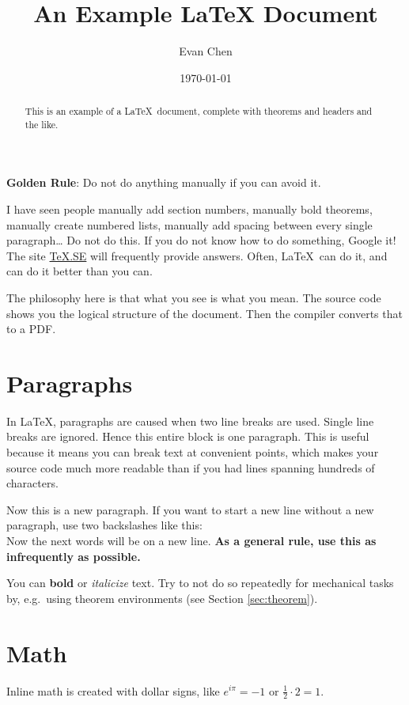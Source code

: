 \documentclass[11pt]{article}
\theoremstyle{plain} %
\theoremstyle{definition}
\theoremstyle{remark}
\newcommand{\half}{\frac{1}{2}}
\begin{document}
\title{An Example LaTeX Document}
\author{Evan Chen}
\date{\today}
\maketitle

\begin{abstract}
	This is an example of a \LaTeX\ document,
	complete with theorems and headers and the like.
\end{abstract}

\tableofcontents

\eject


\textbf{Golden Rule}: Do not do anything manually if you can avoid it.
\bigskip %

I have seen people manually add section numbers, manually bold theorems,
manually create numbered lists, manually add spacing
between every single paragraph\dots
Do not do this. If you do not know how to do something, Google it!
The site \href{http://tex.stackexchange.com}{TeX.SE} will frequently provide answers.
Often, \LaTeX\ can do it,
and can do it better than you can.

The philosophy here is that what you see is what you mean.
The source code shows you the logical structure of the document.
Then the compiler converts that to a PDF.

\section{Paragraphs}
In \LaTeX, paragraphs are caused when two line breaks are used.
Single line breaks are ignored.
Hence this entire block is one paragraph.
This is useful because it means you can break text at convenient points,
which makes your source code much more readable than
if you had lines spanning hundreds of characters.

Now this is a new paragraph. If you want to
start a new line without a new paragraph, use
two backslashes like this:
\\
Now the next words will be on a new line.
\textbf{As a general rule, use this as infrequently as possible.}

You can \textbf{bold} or \textit{italicize} text.
Try to not do so repeatedly for mechanical tasks by,
e.g.\ using theorem environments (see Section \ref{sec:theorem}).


\section{Math}
Inline math is created with dollar signs,
like $e^{i \pi} = -1$ or $\half \cdot 2 = 1$.
\end{document}
